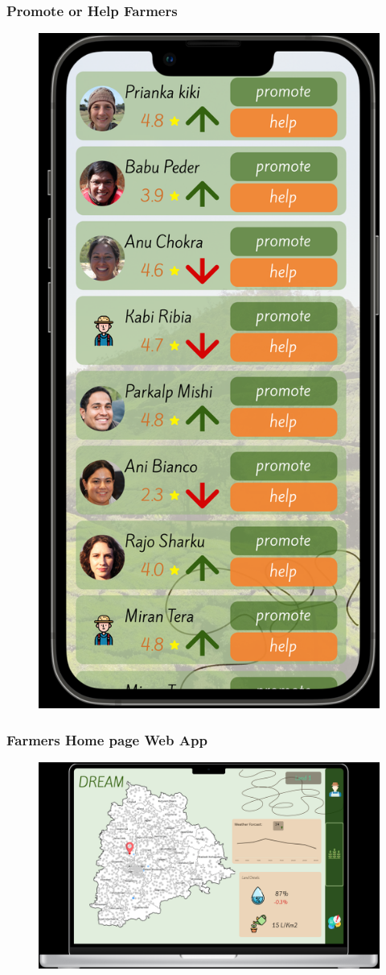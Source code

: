 \subsubsection{Promote or Help Farmers}
    \begin{figure}[ht]
        \centering
        \includegraphics[width = 0.5\linewidth]{figures/farmersList.png}
        \label{fig:profile}
    \end{figure}
\clearpage

\subsubsection{Farmers Home page Web App}
    \begin{figure}[ht]
        \centering
        \includegraphics[width = 0.95\linewidth]{figures/farmersweb.png}
        \label{fig:profile}
    \end{figure}


